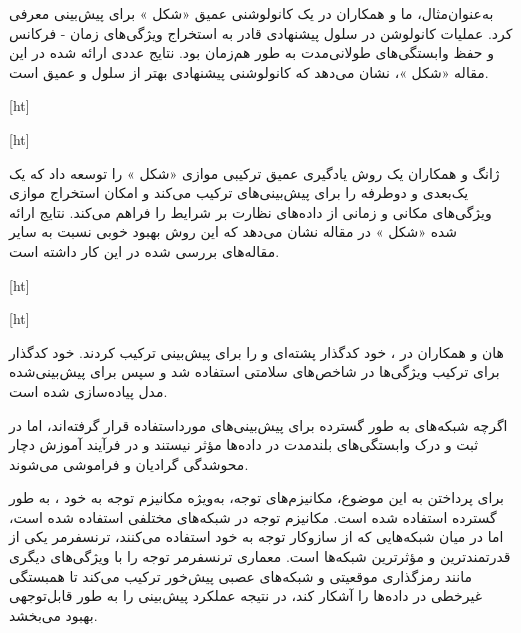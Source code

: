 به‌عنوان‌مثال، ما و همکاران در  یک  کانولوشنی عمیق «شکل » برای پیش‌بینی  معرفی کرد. عملیات کانولوشن در سلول  پیشنهادی قادر به استخراج ویژگی‌های زمان - فرکانس و حفظ وابستگی‌های طولانی‌مدت به طور هم‌زمان بود. نتایج عددی ارائه شده در این مقاله «شکل »، نشان می‌دهد که  کانولوشنی پیشنهادی بهتر از سلول  و  عمیق است. 


[ht]



[ht]





ژانگ و همکاران  یک روش یادگیری عمیق ترکیبی موازی «شکل » را توسعه داد که یک  یک‌بعدی و  دوطرفه را برای پیش‌بینی‌های  ترکیب می‌کند و امکان استخراج موازی ویژگی‌های مکانی و زمانی از داده‌های نظارت بر شرایط را فراهم می‌کند. نتایج ارائه شده «شکل » در مقاله نشان می‌دهد که این روش بهبود خوبی نسبت به سایر مقاله‌های بررسی شده در این کار داشته است.



[ht]



[ht]



 هان و همکاران در ، خود کدگذار پشته‌ای و  را برای پیش‌بینی  ترکیب کردند. خود کدگذار برای ترکیب ویژگی‌ها در شاخص‌های سلامتی استفاده شد و سپس  برای پیش‌بینی‌شده مدل پیاده‌سازی شده است.
 
 
 
 اگرچه شبکه‌های  به طور گسترده برای پیش‌بینی‌های  مورداستفاده قرار گرفته‌اند، اما در ثبت و درک وابستگی‌های بلندمدت در داده‌ها مؤثر نیستند و در فرآیند آموزش دچار محوشدگی گرادیان و فراموشی می‌شوند. 
 
 برای پرداختن به این موضوع، مکانیزم‌های توجه، به‌ویژه مکانیزم توجه به خود ، به طور گسترده استفاده شده است. مکانیزم توجه در شبکه‌های مختلفی استفاده شده است، اما در میان شبکه‌هایی که از سازوکار توجه به خود استفاده می‌کنند، ترنسفرمر یکی از قدرتمندترین و مؤثرترین شبکه‌ها است. معماری ترنسفرمر توجه را با ویژگی‌های دیگری مانند رمزگذاری موقعیتی و شبکه‌های عصبی پیش‌خور ترکیب می‌کند تا همبستگی غیرخطی در داده‌ها را آشکار کند، در نتیجه عملکرد پیش‌بینی را به طور قابل‌توجهی بهبود می‌بخشد.




